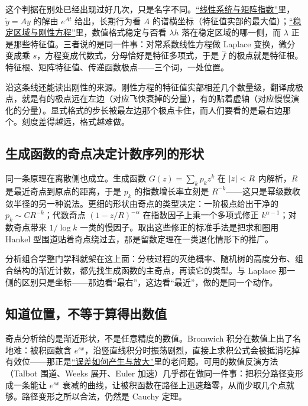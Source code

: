 这个判据在别处已经出现过好几次，只是名字不同。\hyperref[sec:15-Differential-Equations-and-Dynamical-Systems/01-ODE-Theory/02]{``线性系统与矩阵指数''}里，\(\dot y=Ay\) 的解由 \(e^{At}\) 给出，长期行为看 \(A\) 的谱横坐标（特征值实部的最大值）；\hyperref[sec:08-Numerical-Analysis/06-ODE/03]{``稳定区域与刚性方程''}里，数值格式稳定与否看 \(\lambda h\) 落在稳定区域的哪一侧，而 \(\lambda\) 正是那些特征值。三者说的是同一件事：对常系数线性方程做 Laplace 变换，微分变成乘 \(s\)，方程变成代数式，分母恰好是特征多项式，于是 \(\hat f\) 的极点就是特征根。特征根、矩阵特征值、传递函数极点——三个词，一处位置。

沿这条线还能读出刚性的来源。刚性方程的特征值实部相差几个数量级，翻译成极点，就是有的极点远在左边（对应飞快衰掉的分量），有的贴着虚轴（对应慢慢演化的分量）。显式格式的步长被最左边那个极点卡住，而人们要看的是最右边那个。刻度差得越远，格式越难做。

\subsection{生成函数的奇点决定计数序列的形状}

同一条原理在离散侧也成立。生成函数 \(G(z)=\sum_k p_kz^k\) 在 \(\left|z\right|<R\) 内解析，\(R\) 是最近奇点到原点的距离，于是 \(p_k\) 的指数增长率立刻是 \(R^{-k}\)——这只是幂级数收敛半径的另一种说法。更细的形状由奇点的类型决定：一阶极点给出干净的 \(p_k\sim CR^{-k}\)；代数奇点 \((1-z/R)^{-\alpha}\) 在指数因子上乘一个多项式修正 \(k^{\alpha-1}\)；对数奇点带来 \(1/\log k\) 一类的慢因子。取出这些修正的标准手法是把求和圈用 Hankel 型围道贴着奇点绕过去，那是留数定理在一类退化情形下的推广。

分析组合学整门学科就架在这上面：分枝过程的灭绝概率、随机树的高度分布、组合结构的渐近计数，都先找生成函数的主奇点，再读它的类型。与 Laplace 那一侧的区别只是坐标——那边看``最右''，这边看``最近''，做的是同一个动作。

\subsection{知道位置，不等于算得出数值}

奇点分析给的是渐近形状，不是任意精度的数值。Bromwich 积分在数值上出了名地难：被积函数含 \(e^{sx}\)，沿竖直线积分时振荡剧烈，直接上求积公式会被抵消吃掉有效位——那正是\hyperref[sec:08-Numerical-Analysis/01-Floating-Point-and-Error/02]{``误差如何产生与放大''}里的老问题。可用的数值反演方法（Talbot 围道、Weeks 展开、Euler 加速）几乎都在做同一件事：把积分路径变形成一条能让 \(e^{sx}\) 衰减的曲线，让被积函数在路径上迅速趋零，从而少取几个点就够。路径变形之所以合法，仍然是 Cauchy 定理。

